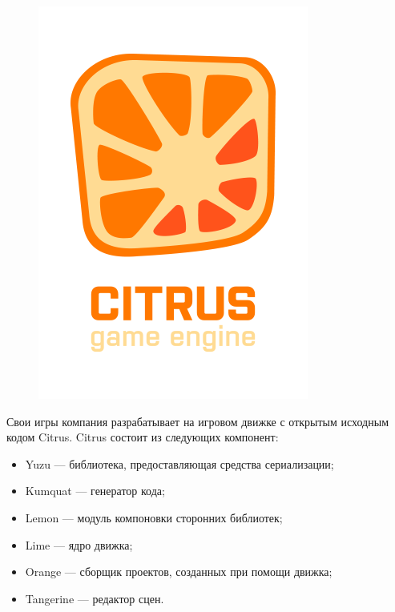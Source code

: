 \documentclass{fefu_thesis/cls/fefu}
\begin{document}
    \begin{figure}[H]
        \centering
        \includegraphics[scale=0.4]{images/Citrus.png}
    \end{figure}

    Свои игры компания разрабатывает на игровом движке с открытым исходным кодом Citrus.  Citrus состоит из следующих компонент:

    \begin{itemize}
      \item Yuzu --- библиотека, предоставляющая средства сериализации;
      \item Kumquat --- генератор кода;
      \item Lemon --- модуль компоновки сторонних библиотек;
      \item Lime --- ядро движка;
      \item Orange --- сборщик проектов, созданных при помощи движка;
      \item Tangerine --- редактор сцен.
    \end{itemize}
\end{document}
